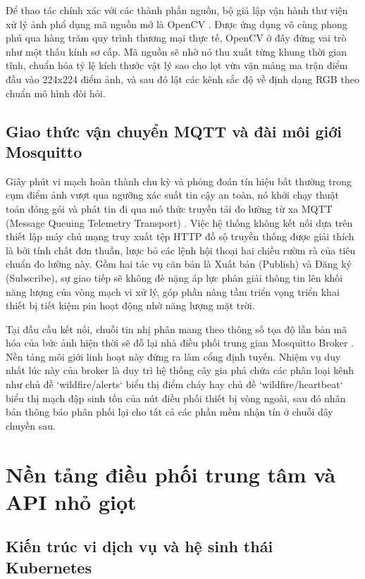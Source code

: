 \documentclass[12pt,a4paper]{report}
\begin{document}
Để thao tác chính xác với các thành phần nguồn, bộ giả lập vận hành thư viện xử lý ảnh phổ dụng mã nguồn mở là OpenCV \cite{opencv}. Được ứng dụng vô cùng phong phú qua hàng trăm quy trình thương mại thực tế, OpenCV ở đây đứng vai trò như một thấu kính sơ cấp. Mã nguồn sẽ nhờ nó thu xuất từng khung thời gian tĩnh, chuẩn hóa tỷ lệ kích thước vật lý sao cho lọt vừa vặn mảng ma trận điểm đầu vào 224x224 điểm ảnh, và sau đó lật các kênh sắc độ về định dạng RGB theo chuẩn mô hình đòi hỏi.

\subsection{Giao thức vận chuyển MQTT và đài môi giới Mosquitto}

Giây phút vi mạch hoàn thành chu kỳ và phỏng đoán tín hiệu bất thường trong cụm điểm ảnh vượt qua ngưỡng xác suất tin cậy an toàn, nó khởi chạy thuật toán đóng gói và phát tin đi qua mô thức truyền tải đo lường từ xa MQTT (Message Queuing Telemetry Transport) \cite{mqtt}. Việc hệ thống không kết nối dựa trên thiết lập máy chủ mạng truy xuất tệp HTTP đồ sộ truyền thống được giải thích là bởi tính chất đơn thuần, lược bỏ các lệnh hội thoại hai chiều rườm rà của tiêu chuẩn đo lường này. Gồm hai tác vụ căn bản là Xuất bản (Publish) và Đăng ký (Subscribe), sự giao tiếp sẽ không đè nặng áp lực phân giải thông tin lên khối năng lượng của vòng mạch vi xử lý, góp phần nâng tầm triển vọng triển khai thiết bị tiết kiệm pin hoạt động nhờ năng lượng mặt trời.

Tại đầu cầu kết nối, chuỗi tin nhị phân mang theo thông số tọa độ lẫn bản mã hóa của bức ảnh hiện thời sẽ đỗ lại nhà điều phối trung gian Mosquitto Broker \cite{mosquitto}. Nền tảng môi giới linh hoạt này đứng ra làm cổng định tuyến. Nhiệm vụ duy nhất lúc này của broker là duy trì hệ thống cây gia phả chứa các phân loại kênh như chủ đề `wildfire/alerts` biểu thị điểm cháy hay chủ đề `wildfire/heartbeat` biểu thị mạch đập sinh tồn của nút điều phối thiết bị vòng ngoài, sau đó nhân bản thông báo phân phối lại cho tất cả các phần mềm nhận tín ở chuỗi dây chuyền sau. 

\section{Nền tảng điều phối trung tâm và API nhỏ giọt}

\subsection{Kiến trúc vi dịch vụ và hệ sinh thái Kubernetes}
\end{document}

